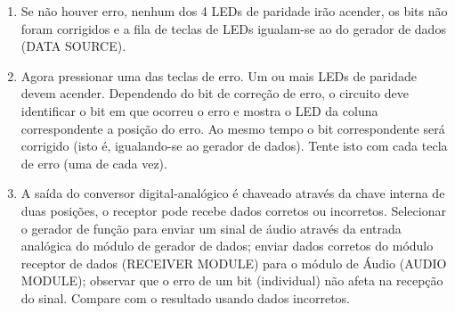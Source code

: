 \begin{enumerate}
                    \item Se não houver erro, nenhum dos 4 LEDs de paridade irão acender, os bits não foram corrigidos
                    e a fila de teclas de LEDs igualam-se ao do gerador de dados (DATA SOURCE).
                    
                    \item Agora pressionar uma das teclas de erro. Um ou mais LEDs de paridade devem acender.
                    Dependendo do bit de correção de erro, o circuito deve identificar o bit em que ocorreu o
                    erro e mostra o LED da coluna correspondente a posição do erro. Ao mesmo tempo o bit
                    correspondente será corrigido (isto é, igualando-se ao gerador de dados). Tente isto com cada
                    tecla de erro (uma de cada vez).
                    
                    \item A saída do conversor digital-analógico é chaveado através da chave interna de duas posições, o
                    receptor pode recebe dados corretos ou incorretos. Selecionar o gerador de função para enviar
                    um sinal de áudio através da entrada analógica do módulo de gerador de dados; enviar dados
                    corretos do módulo receptor de dados (RECEIVER MODULE) para o módulo de Áudio
                    (AUDIO MODULE); observar que o erro de um bit (individual) não afeta na recepção do
                    sinal. Compare com o resultado usando dados incorretos.
                \end{enumerate}

                
